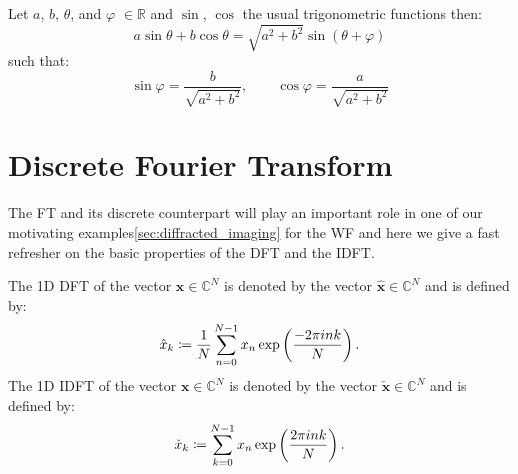 	\begin{Lem}\label{lemma:inverse_a_sin_b_cos}
		Let $a$, $b$, $\theta$, and $\varphi$ $\in \mathbb{R}$ and $\sin$, $\cos$ 
        the usual trigonometric functions then:
		\begin{equation}
			a\sin \theta+b\cos \theta  = \sqrt{a^2+b^2}\sin(\theta + \varphi)
		\end{equation}
		such that:
		\begin{equation}
			\sin\varphi=\frac{b}{\sqrt{a^2+b^2}}, \qquad \cos\varphi = \frac{a}{\sqrt{a^2+b^2}}
		\end{equation}
		\end{Lem}


\section{Discrete Fourier Transform}
The \ac{FT} and its discrete counterpart will play an important role in one of our motivating examples\cref{sec:diffracted_imaging} 
for the \ac{WF} and here we give a fast refresher on the basic properties of the \ac{DFT} and the \ac{IDFT}.

\begin{Def}\label{def:1ddft_1didft}
    The 1D \ac{DFT}  of the vector $\boldsymbol{x} \in \mathbb{C}^{N}$ is denoted by the vector $\hat {\boldsymbol{x}} \in \mathbb{C}^{N}$ and is defined by:
    \begin{equation}\label{eq:1ddft}
        {\hat x}_k \coloneqq \frac{1}{N}\sum_{n=0}^{N-1} x_n\exp\left({\frac{-2\pi ink}{N}}\right)\index{\ac{FT}!$1$-$d$ \ac{DFT}}.
    \end{equation}
    The 1D \ac{IDFT}  of the vector $\boldsymbol{x} \in \mathbb{C}^{N}$ is denoted by the vector $\check {\boldsymbol{x}} \in \mathbb{C}^{N}$ and is defined by:
    \begin{equation}\label{eq:1didft}
        \check {x}_k \coloneqq \sum_{k=0}^{N-1}x_{n}\exp\left({\frac{2\pi ink}{N}}\right)\index{\ac{FT}!$1$-$d$ \ac{IDFT}}.
    \end{equation}    
\end{Def}

